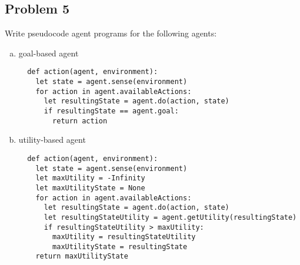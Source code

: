 \documentclass{math}
\begin{document}
\subsection*{Problem 5}
Write pseudocode agent programs for the following agents:
\begin{enumerate}[(a)]
  \item goal-based agent
  \begin{lstlisting}
  def action(agent, environment):
    let state = agent.sense(environment)
    for action in agent.availableActions:
      let resultingState = agent.do(action, state)
      if resultingState == agent.goal:
        return action
  \end{lstlisting}
  \item utility-based agent
  \begin{lstlisting}
  def action(agent, environment):
    let state = agent.sense(environment)
    let maxUtility = -Infinity
    let maxUtilityState = None
    for action in agent.availableActions:
      let resultingState = agent.do(action, state)
      let resultingStateUtility = agent.getUtility(resultingState)
      if resultingStateUtility > maxUtility:
        maxUtility = resultingStateUtility
        maxUtilityState = resultingState
    return maxUtilityState
  \end{lstlisting}
\end{enumerate}
\end{document}
